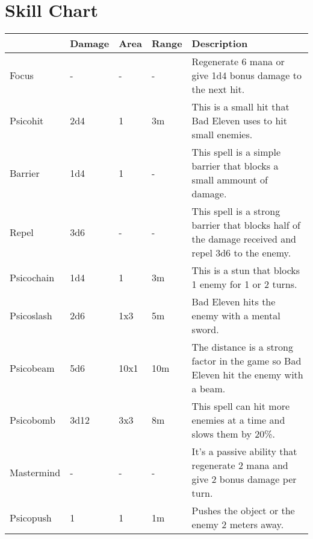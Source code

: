 \section{Skill Chart}

\vspace*{0.5cm}

\begin{center}
	\begin{tabular}[c]{| p{3cm} | p{1.2cm} | p{1.2cm} | p{1.2cm} | p{6cm} |}
		\hline
		& Damage & Area & Range & Description \\
		\hline
		Focus & - & - & - & Regenerate 6 mana or give 1d4 bonus damage to the next hit.\\
		\hline
		Psicohit & 2d4 & 1 & 3m & This is a small hit that Bad Eleven uses to hit small enemies.\\
		\hline
		Barrier & 1d4 & 1 & - & This spell is a simple barrier that blocks a small ammount of damage.\\
		\hline
		Repel & 3d6 & - & - & This spell is a strong barrier that blocks half of the damage received and repel 3d6 to the enemy.\\
		\hline
		Psicochain & 1d4 & 1 & 3m & This is a stun that blocks 1 enemy for 1 or 2 turns.\\
		\hline
		Psicoslash & 2d6 & 1x3 & 5m & Bad Eleven hits the enemy with a mental sword.\\
		\hline
		Psicobeam & 5d6 & 10x1 & 10m & The distance is a strong factor in the game so Bad Eleven hit the enemy with a beam.\\
		\hline
		Psicobomb & 3d12 & 3x3 & 8m & This spell can hit more enemies at a time and slows them by 20\%.\\
		\hline
		Mastermind & - & - & - & It's a passive ability that regenerate 2 mana and give 2 bonus damage per turn.\\
		\hline
		Psicopush & 1 & 1 & 1m & Pushes the object or the enemy 2 meters away.\\
		\hline
	\end{tabular}
\end{center}